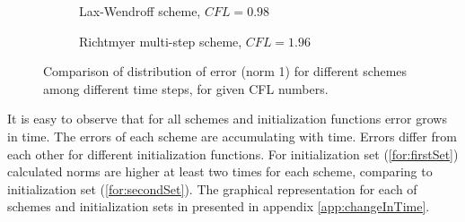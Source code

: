 \begin{figure}[!htbp]
	\begin{subfigure}[b]{0.5\textwidth}
		\caption{Lax-Wendroff scheme, $CFL=0.98$}
	\end{subfigure}
	\begin{subfigure}[b]{0.5\textwidth}
		\caption{Richtmyer multi-step scheme, $CFL=1.96$}
	\end{subfigure}
	\caption{Comparison of distribution of error (norm 1) for different schemes among different time steps, for given CFL numbers.}
	\label{fig:normsInTime}
\end{figure}
 It is easy to observe that for all schemes and initialization functions error grows in time. The errors of each scheme are accumulating with time. Errors	differ from each other for different initialization functions. For initialization set (\ref{for:firstSet}) calculated norms are higher at least two times for each scheme, comparing to initialization set (\ref{for:secondSet}). The graphical representation for each of schemes and initialization sets in presented in appendix \ref{app:changeInTime}.
 \clearpage